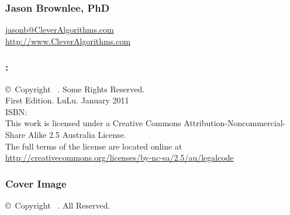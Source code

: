
\newpage
\begin{flushleft}
\begin{small}

\vspace*{\fill}

\subsubsection*{Jason Brownlee, PhD}
\url{jasonb@CleverAlgorithms.com} \\
\url{http://www.CleverAlgorithms.com} \\

\subsubsection*{\mybooktitle: \mybooksubtitle}
\copyright\ Copyright \mybookdate\ \mybookauthor. Some Rights Reserved. \\

First Edition. LuLu. January 2011 \\
ISBN: \\

This work is licensed under a Creative Commons Attribution\--Noncommercial\--Share Alike 2.5 Australia License. \\
The full terms of the license are located online at \url{http://creativecommons.org/licenses/by-nc-sa/2.5/au/legalcode} \\

\subsubsection*{Cover Image}
\copyright\ Copyright \mybookdate\ \mybookauthor. All Reserved. \\

\end{small}
\end{flushleft}
